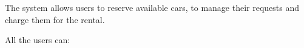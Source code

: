 The system allows users to reserve available cars, to manage their requests and charge them for the rental.

All the users can: